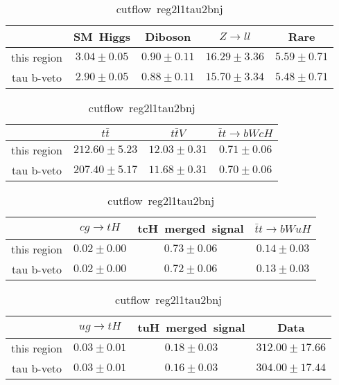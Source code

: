 \begin{table}
\footnotesize
\caption{cutflow~reg2l1tau2bnj}
\centering
\begin{tabular}{|c|c|c|c|c|} \hline
 & SM~Higgs & Diboson & $Z\to ll$ & Rare\\\hline
this region & $3.04\pm0.05$ & $0.90\pm0.11$ & $16.29\pm3.36$ & $5.59\pm0.71$\\\hline
tau b-veto & $2.90\pm0.05$ & $0.88\pm0.11$ & $15.70\pm3.34$ & $5.48\pm0.71$\\\hline
\end{tabular}
\begin{tabular}{|c|c|c|c|} \hline
 & $t\bar{t}$ & $t\bar{t}V$ & $\bar{t}t\to bWcH$\\\hline
this region & $212.60\pm5.23$ & $12.03\pm0.31$ & $0.71\pm0.06$\\\hline
tau b-veto & $207.40\pm5.17$ & $11.68\pm0.31$ & $0.70\pm0.06$\\\hline
\end{tabular}
\begin{tabular}{|c|c|c|c|} \hline
 & $cg\to tH$ & tcH~merged~signal & $\bar{t}t\to bWuH$\\\hline
this region & $0.02\pm0.00$ & $0.73\pm0.06$ & $0.14\pm0.03$\\\hline
tau b-veto & $0.02\pm0.00$ & $0.72\pm0.06$ & $0.13\pm0.03$\\\hline
\end{tabular}
\begin{tabular}{|c|c|c|c|} \hline
 & $ug\to tH$ & tuH~merged~signal & Data\\\hline
this region & $0.03\pm0.01$ & $0.18\pm0.03$ & $312.00\pm17.66$\\\hline
tau b-veto & $0.03\pm0.01$ & $0.16\pm0.03$ & $304.00\pm17.44$\\\hline
\end{tabular}
\label{tab:cutflow_reg2l1tau2bnj}
\end{table}
